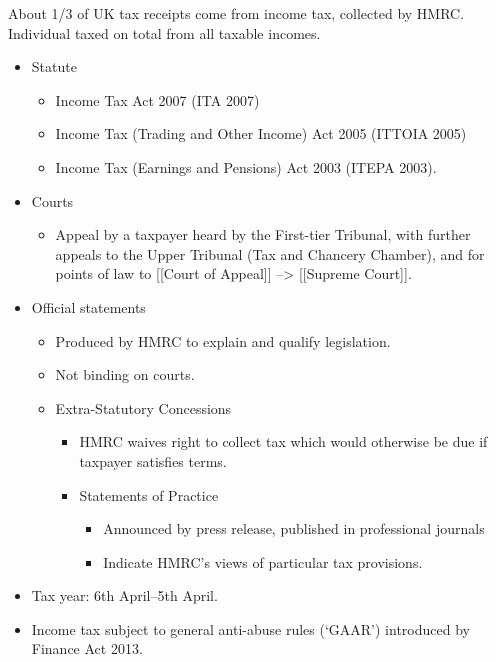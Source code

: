 \documentclass[
]{article}
\providecommand{\tightlist}{%
  \setlength{\itemsep}{0pt}\setlength{\parskip}{0pt}}
\begin{document}
About 1/3 of UK tax receipts come from income tax, collected by HMRC.
Individual taxed on total from all taxable incomes.

\begin{itemize}
\tightlist
\item
  Statute

  \begin{itemize}
  \tightlist
  \item
    Income Tax Act 2007 (ITA 2007)
  \item
    Income Tax (Trading and Other Income) Act 2005 (ITTOIA 2005)
  \item
    Income Tax (Earnings and Pensions) Act 2003 (ITEPA 2003).
  \end{itemize}
\item
  Courts

  \begin{itemize}
  \tightlist
  \item
    Appeal by a taxpayer heard by the First-tier Tribunal, with further
    appeals to the Upper Tribunal (Tax and Chancery Chamber), and for
    points of law to {[}{[}Court of Appeal{]}{]} --\textgreater{}
    {[}{[}Supreme Court{]}{]}.
  \end{itemize}
\item
  Official statements

  \begin{itemize}
  \tightlist
  \item
    Produced by HMRC to explain and qualify legislation.
  \item
    Not binding on courts.
  \item
    Extra-Statutory Concessions

    \begin{itemize}
    \tightlist
    \item
      HMRC waives right to collect tax which would otherwise be due if
      taxpayer satisfies terms.
    \item
      Statements of Practice

      \begin{itemize}
      \tightlist
      \item
        Announced by press release, published in professional journals
      \item
        Indicate HMRC's views of particular tax provisions.
      \end{itemize}
    \end{itemize}
  \end{itemize}
\item
  Tax year: 6th April--5th April.
\item
  Income tax subject to general anti-abuse rules (`GAAR') introduced by
  Finance Act 2013.
\end{itemize}
\end{document}

